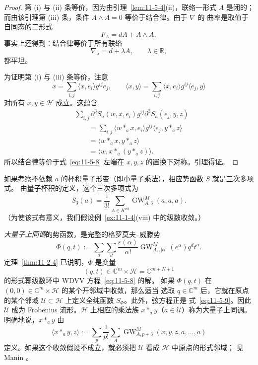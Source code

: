 \begin{proof}
第 (i) 与 (ii) 条等价，因为由引理~\ref{lem:11-5-4}(ii)，联络一形式
$A$ 是闭的；而由该引理第 (iii) 条，条件 $A\wedge A=0$ 等价于结合律。由于 $\nabla$ 的
曲率是取值于自同态的二形式
\[
  F_A=dA+A\wedge A,
\]
事实上还得到：结合律等价于所有联络
\[
  \nabla_\lambda=d+\lambda A,
  \qquad \lambda\in\mathbb R,
\]
都平坦。

为证明第 (i) 与 (iii) 条等价，注意
\[
  x=\sum_{i,j}\langle x,e_i\rangle g^{ij}e_j,
  \qquad
  \langle x,y\rangle
  =\sum_{i,j}\langle x,e_i\rangle g^{ij}\langle e_j,y\rangle
\]
对所有 $x,y\in\mathcal H$ 成立。这蕴含
\begin{align*}
  &\sum_{i,j}\partial^3S_a(w,x,e_i)g^{ij}
  \partial^3S_a(e_j,y,z)\\
  &\qquad
  =\sum_{i,j}\langle w*_a x,e_i\rangle g^{ij}
    \langle e_j,y*_a z\rangle\\
  &\qquad
  =\langle w*_a x,y*_a z\rangle\\
  &\qquad
  =\langle w,x*_a(y*_a z)\rangle.
\end{align*}
所以结合律等价于式~\eqref{eq:11-5-8} 左端在 $x,y,z$ 的置换下对称。引理得证。
\end{proof}

如果考察不依赖 $a$ 的杯积量子形变（即小量子乘法），相应势函数 $S$ 就是三次多项式。
由量子杯积的定义，这个三次多项式为
\[
  S_3(a)=\frac1{3!}\sum_{A\in K^{\mathrm{eff}}}
  \operatorname{GW}^M_{A,3}(a,a,a).
\]
（为使该式有意义，我们假设例~\ref{ex:11-1-4}(viii) 中的级数收敛。）

\emph{大量子上同调}的势函数，是完整的格罗莫夫--威滕势
\[
  \Phi(q,t):=\sum_\alpha\sum_d\frac{\varepsilon(\alpha)}{\alpha!}
  \operatorname{GW}^M_{A_d,|\alpha|}(e^\alpha)q^dt^\alpha.
\]
定理~\ref{thm:11-2-4} 已说明，$\Phi$ 是变量
\[
  (q,t)\in\mathbb C^m\times\mathcal H=\mathbb C^{m+N+1}
\]
的形式幂级数环中 WDVV 方程~\eqref{eq:11-5-8} 的解。
如果 $\Phi(q,t)$ 在 $(0,0)\in\mathbb C^m\times\mathcal H$ 的某个开邻域中收敛，那么适当
选取 $q\in\mathbb C^m$ 后，它就在原点的某个邻域
$\mathcal U\subset\mathcal H$ 上定义全纯函数 $S_\Phi$。此外，弦方程正是
式~\eqref{eq:11-5-9}。因此 $\mathcal U$ 成为 Frobenius 流形。$\mathcal H$ 上相应的乘法族
$x*_a y$（$a\in\mathcal U$）称为大量子上同调。明确地说，$x*_a y$ 由
\[
  \langle x*_a y,z\rangle
  :=\sum_p\frac1{p!}\sum_A
  \operatorname{GW}^M_{A,p+3}(x,y,z,a,\ldots,a)
\]
定义。如果这个收敛假设不成立，就必须把 $\mathcal U$ 看成 $\mathcal H$ 中原点的形式邻域；
见 Manin 。

